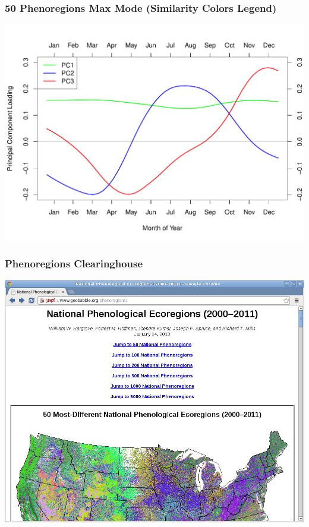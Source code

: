 \begin{frame}
 \frametitle{50 Phenoregions Max Mode (Similarity Colors Legend)}
 \begin{center}
  \vskip-0.30in
  \includegraphics[width=\textwidth]{figures/phenology_2000-2012_pc.pdf}
 \end{center}
\end{frame}

\begin{frame}
 \frametitle{Phenoregions Clearinghouse}
 \includegraphics[width=\textwidth]{figures/phenoregions_clearinghouse.png}
\end{frame}

